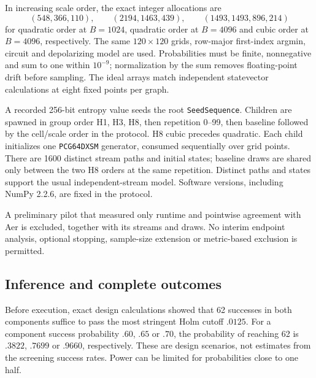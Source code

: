 In increasing scale order, the exact integer allocations are
\[
(548,366,110),\qquad (2194,1463,439),\qquad (1493,1493,896,214)
\]
for quadratic order at $B=1024$, quadratic order at $B=4096$ and cubic order at $B=4096$, respectively. The same $120\times120$ grids, row-major first-index argmin, circuit and depolarizing model are used. Probabilities must be finite, nonnegative and sum to one within $10^{-9}$; normalization by the sum removes floating-point drift before sampling. The ideal arrays match independent statevector calculations at eight fixed points per graph.

A recorded 256-bit entropy value seeds the root \texttt{SeedSequence}. Children are spawned in group order H1, H3, H8, then repetition 0--99, then baseline followed by the cell/scale order in the protocol. H8 cubic precedes quadratic. Each child initializes one \texttt{PCG64DXSM} generator, consumed sequentially over grid points. There are 1600 distinct stream paths and initial states; baseline draws are shared only between the two H8 orders at the same repetition. Distinct paths and states support the usual independent-stream model. Software versions, including NumPy 2.2.6, are fixed in the protocol.

A preliminary pilot that measured only runtime and pointwise agreement with Aer is excluded, together with its streams and draws. No interim endpoint analysis, optional stopping, sample-size extension or metric-based exclusion is permitted.

\subsection{Inference and complete outcomes}
Before execution, exact design calculations showed that 62 successes in both components suffice to pass the most stringent Holm cutoff $.0125$. For a component success probability $.60$, $.65$ or $.70$, the probability of reaching 62 is $.3822$, $.7699$ or $.9660$, respectively. These are design scenarios, not estimates from the screening success rates. Power can be limited for probabilities close to one half.

